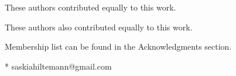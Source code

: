 \documentclass[10pt,letterpaper]{article}
\begin{document}
\begin{flushleft}
%
%
\Yinyang These authors contributed equally to this work.

\ddag These authors also contributed equally to this work.



\textpilcrow Membership list can be found in the Acknowledgments section.

* saskiahiltemann@gmail.com

\end{flushleft}


\end{document}
